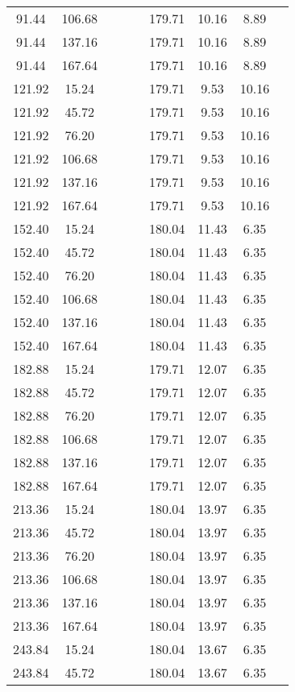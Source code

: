 \begin{center}
\begin{tabular}{| c | c | c | c | c | c | c | c | c |}
91.44 & 106.68 &  &  &  & 179.71 & 10.16 & 8.89 \\
91.44 & 137.16 &  &  &  & 179.71 & 10.16 & 8.89 \\
91.44 & 167.64 &  &  &  & 179.71 & 10.16 & 8.89 \\
121.92 & 15.24 &  &  &  & 179.71 & 9.53 & 10.16 \\
121.92 & 45.72 &  &  &  & 179.71 & 9.53 & 10.16 \\
121.92 & 76.20 &  &  &  & 179.71 & 9.53 & 10.16 \\
121.92 & 106.68 &  &  &  & 179.71 & 9.53 & 10.16 \\
121.92 & 137.16 &  &  &  & 179.71 & 9.53 & 10.16 \\
121.92 & 167.64 &  &  &  & 179.71 & 9.53 & 10.16 \\
152.40 & 15.24 &  &  &  & 180.04 & 11.43 & 6.35 \\
152.40 & 45.72 &  &  &  & 180.04 & 11.43 & 6.35 \\
152.40 & 76.20 &  &  &  & 180.04 & 11.43 & 6.35 \\
152.40 & 106.68 &  &  &  & 180.04 & 11.43 & 6.35 \\
152.40 & 137.16 &  &  &  & 180.04 & 11.43 & 6.35 \\
152.40 & 167.64 &  &  &  & 180.04 & 11.43 & 6.35 \\
182.88 & 15.24 &  &  &  & 179.71 & 12.07 & 6.35 \\
182.88 & 45.72 &  &  &  & 179.71 & 12.07 & 6.35 \\
182.88 & 76.20 &  &  &  & 179.71 & 12.07 & 6.35 \\
182.88 & 106.68 &  &  &  & 179.71 & 12.07 & 6.35 \\
182.88 & 137.16 &  &  &  & 179.71 & 12.07 & 6.35 \\
182.88 & 167.64 &  &  &  & 179.71 & 12.07 & 6.35 \\
213.36 & 15.24 &  &  &  & 180.04 & 13.97 & 6.35 \\
213.36 & 45.72 &  &  &  & 180.04 & 13.97 & 6.35 \\
213.36 & 76.20 &  &  &  & 180.04 & 13.97 & 6.35 \\
213.36 & 106.68 &  &  &  & 180.04 & 13.97 & 6.35 \\
213.36 & 137.16 &  &  &  & 180.04 & 13.97 & 6.35 \\
213.36 & 167.64 &  &  &  & 180.04 & 13.97 & 6.35 \\
243.84 & 15.24 &  &  &  & 180.04 & 13.67 & 6.35 \\
243.84 & 45.72 &  &  &  & 180.04 & 13.67 & 6.35 \\

\end{tabular}
\end{center}
